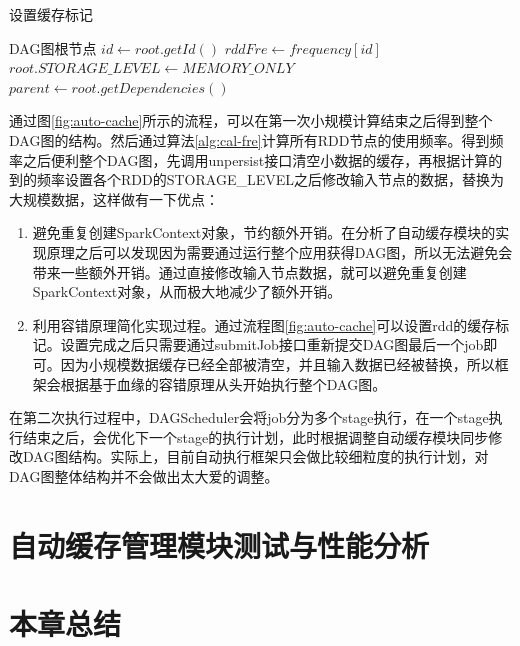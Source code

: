 \begin{algorithm}  
    \caption{设置缓存标记}  
    \begin{algorithmic}[1] %
        \Require DAG图根节点
            \State $id \gets root.getId()$
            \State $rddFre \gets frequency[id]$
                \State $root.STORAGE\_LEVEL \gets MEMORY\_ONLY$
            \EndIf
            \State $parent \gets root.getDependencies()$
                \State {}
            \EndFor
        \EndFunction
    \end{algorithmic}
    \label{alg:set-cache}
\end{algorithm}

通过图\ref{fig:auto-cache}所示的流程，可以在第一次小规模计算结束之后得到整个DAG图的结构。然后通过算法\ref{alg:cal-fre}计算所有RDD节点的使用频率。得到频率之后便利整个DAG图，先调用unpersist接口清空小数据的缓存，再根据计算的到的频率设置各个RDD的STORAGE\_LEVEL之后修改输入节点的数据，替换为大规模数据，这样做有一下优点：

\begin{enumerate}
    \item 避免重复创建SparkContext对象，节约额外开销。在分析了自动缓存模块的实现原理之后可以发现因为需要通过运行整个应用获得DAG图，所以无法避免会带来一些额外开销。通过直接修改输入节点数据，就可以避免重复创建SparkContext对象，从而极大地减少了额外开销。
    \item 利用容错原理简化实现过程。通过流程图\ref{fig:auto-cache}可以设置rdd的缓存标记。设置完成之后只需要通过submitJob接口重新提交DAG图最后一个job即可。因为小规模数据缓存已经全部被清空，并且输入数据已经被替换，所以框架会根据基于血缘的容错原理从头开始执行整个DAG图。
\end{enumerate}

在第二次执行过程中，DAGScheduler会将job分为多个stage执行，在一个stage执行结束之后，会优化下一个stage的执行计划，此时根据调整自动缓存模块同步修改DAG图结构。实际上，目前自动执行框架只会做比较细粒度的执行计划，对DAG图整体结构并不会做出太大爱的调整。

\section{自动缓存管理模块测试与性能分析}
\section{本章总结}


